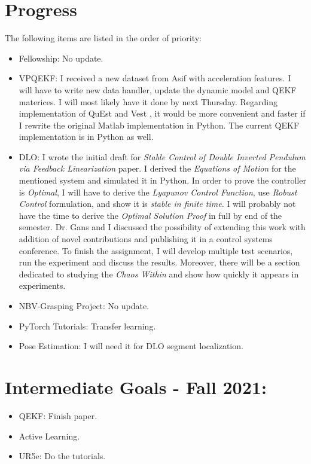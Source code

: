 \documentclass[11pt]{article}
\begin{document}
\section{Progress}
The following items are listed in the order of priority:
\begin{itemize}
      \item Fellowship: No update.
      \item VPQEKF: I received a new dataset from Asif with acceleration features.
      I will have to write new data handler, update the dynamic model and QEKF
      materices. I will most likely have it done by next Thursday. Regarding
      implementation of QuEst and Vest \cite{quest}, it would be more convenient
      and faster if I rewrite the original Matlab implementation in Python. The
      current QEKF implementation is in Python as well.

      \item DLO: I wrote the initial draft for \emph{Stable Control of Double
      Inverted Pendulum via Feedback Linearization} paper. I derived the
      \emph{Equations of Motion} for the mentioned system and simulated it
      in Python. In order to prove the controller is \emph{Optimal}, I will have
      to derive the \emph{Lyapunov Control Function}, use \emph{Robust Control}
      formulation, and show it is \emph{stable in finite time}. I will probably
      not have the time to derive the \emph{Optimal Solution Proof} in full by
      end of the semester. Dr. Gans and I discussed the possibility of extending
      this work with addition of novel contributions and publishing it in a
      control systems conference. To finish the assignment, I will develop
      multiple test scenarios, run the experiment and discuss the results.
      Moreover, there will be a section dedicated to studying the \emph{Chaos
      Within} and show how quickly it appears in experiments.

      \item NBV-Grasping Project: No update.
      \item PyTorch Tutorials: Transfer learning.
      \item Pose Estimation: I will need it for DLO segment localization.
\end{itemize}


\section{Intermediate Goals - Fall 2021:}
\begin{itemize}
      \item QEKF: Finish paper.
      \item Active Learning.
      \item UR5e: Do the tutorials.
\end{itemize}


\newpage


\end{document}
